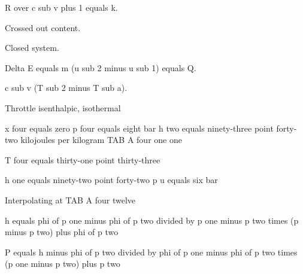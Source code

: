 R over c sub v plus 1 equals k.

Crossed out content.

Closed system.

Delta E equals m (u sub 2 minus u sub 1) equals Q.

c sub v (T sub 2 minus T sub a).

Throttle isenthalpic, isothermal

x four equals zero
p four equals eight bar
h two equals ninety-three point forty-two kilojoules per kilogram
TAB A four one one

T four equals thirty-one point thirty-three

h one equals ninety-two point forty-two
p u equals six bar

Interpolating at TAB A four twelve

h equals phi of p one minus phi of p two divided by p one minus p two times (p minus p two) plus phi of p two

P equals h minus phi of p two divided by phi of p one minus phi of p two times (p one minus p two) plus p two